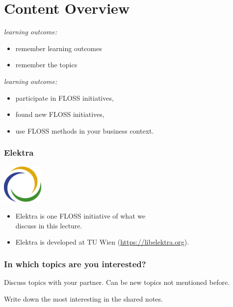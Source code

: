 \section{Content Overview}

\begin{frame}
	\textit{learning outcome:}
	\begin{itemize}
		\item remember learning outcomes
		\item remember the topics
	\end{itemize}
\end{frame}

\begin{frame}
	\textit{learning outcome:}
	\begin{itemize}
		\item participate in FLOSS initiatives,
		\item found new FLOSS initiatives,
		\item use FLOSS methods in your business context.
	\end{itemize}
\end{frame}




\begin{frame}
	\frametitle{Elektra}
	\hfill \includegraphics[width=2cm]{../figures/logo}
	\vspace{-1cm}
	\begin{itemize}
		\item Elektra is one FLOSS initiative of what we \\ discuss in this lecture.
		\item Elektra is developed at TU Wien (\url{https://libelektra.org}).
	\end{itemize}
\end{frame}

\begin{assignment}
	\frametitle{In which topics are you interested?}
	\begin{task}[1]
	Discuss topics with your partner.
	Can be new topics not mentioned before.
	\end{task}

	\begin{task}[2]
	Write down the most interesting in the shared notes.
	\end{task}
\end{assignment}





